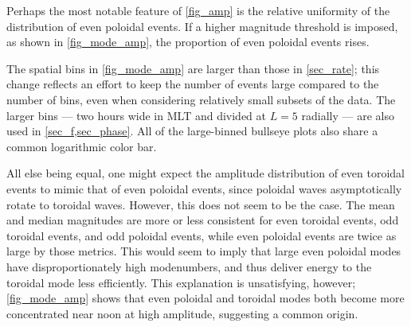 

Perhaps the most notable feature of \cref{fig_amp} is the relative uniformity
of the distribution of even poloidal events. If a higher magnitude threshold is
imposed, as shown in \cref{fig_mode_amp}, the proportion of even poloidal
events rises. 

The spatial bins in \cref{fig_mode_amp} are larger than those in
\cref{sec_rate}; this change reflects an effort to keep the number of events
large compared to the number of bins, even when considering relatively small
subsets of the data. The larger bins --- two hours wide in MLT and divided at
$L = 5$ radially --- are also used in \cref{sec_f,sec_phase}. All of the
large-binned bullseye plots also share a common logarithmic color bar. 

All else being equal, one might expect the amplitude distribution of even
toroidal events to mimic that of even poloidal events, since poloidal waves
asymptotically rotate to toroidal waves. However, this does not seem to be the
case. The mean and median magnitudes are more or less consistent for even
toroidal events, odd toroidal events, and odd poloidal events, while even
poloidal events are twice as large by those metrics. This would seem to imply
that large even poloidal modes have disproportionately high modenumbers, and
thus deliver energy to the toroidal mode less efficiently. This explanation
is unsatisfying, however; \cref{fig_mode_amp} shows that even poloidal and
toroidal modes both become more concentrated near noon at high amplitude,
suggesting a common origin. 


